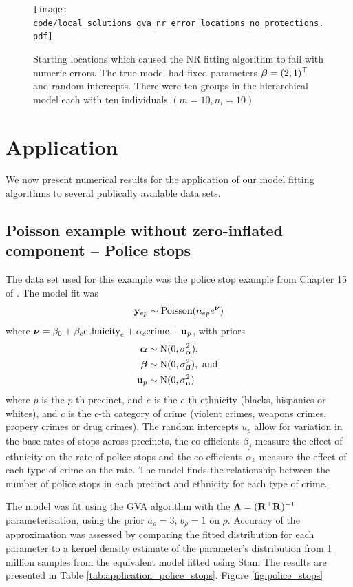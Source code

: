\begin{figure}[h!]
	\texttt{[image: code/local\_solutions\_gva\_nr\_error\_locations\_no\_protections.pdf]}
	\label{fig:stability_locations_nr}
	\caption{Starting locations which caused the NR fitting algorithm to fail with numeric errors. The true model had fixed parameters ${\boldsymbol \beta} = (2, 1)^\top$ and random intercepts. There were ten groups in the
	hierarchical model each	with ten individuals $(m=10, n_i=10)$}
\end{figure}

\section{Application}
We now present numerical results for the application of our model fitting algorithms to several publically
available data sets.

\label{sec:application}

\subsection{Poisson example without zero-inflated component -- Police stops}
\label{sec:police_stops}
The data set used for this example was the police stop example from Chapter 15 of \cite{Gelman2007}.
The model fit was
$$
	{\bf y}_{ep}        \sim \text{Poisson}(n_{ep} e^{\boldsymbol \nu})
$$
where ${\boldsymbol \nu} = {\beta_0 + \beta_e \text{ethnicity}_e + \alpha_{c} \text{crime} + {\bf u}_p}$, with priors
\begin{align*}
	{\boldsymbol\alpha}				& \sim \text{N}(0, \sigma_{\boldsymbol \alpha}^2),	\\
	{\boldsymbol \beta}        & \sim \text{N}(0, \sigma_{\boldsymbol \beta}^2), \text{ and }\\
	{\bf u}_p         & \sim \text{N}(0, \sigma_{\bf u}^2)
\end{align*}
where $p$ is the $p$-th precinct, and $e$ is the $e$-th ethnicity (blacks, hispanics or whites), and $c$ is
the $c$-th category of crime (violent crimes, weapons crimes, propery crimes or drug crimes). The random
intercepts $u_p$ allow for variation in the base rates of stops across precincts, the co-efficients $\beta_j$
measure the effect of ethnicity on the rate of police stops and the co-efficients $\alpha_k$ measure the
effect of each type of crime on the rate. The model finds the relationship between the number of police stops
in each precinct and  ethnicity for each type of crime.

The model was fit using the GVA algorithm with the ${\boldsymbol \Lambda} = ({\bf R}^\top {\bf R})^{-1}$ parameterisation, using
the prior $a_\rho = 3$, $b_\rho = 1$ on $\rho$. Accuracy of the approximation was assessed by comparing the
fitted distribution for each parameter to a kernel density estimate of the parameter's distribution from 1
million samples from the equivalent model fitted using Stan. The results are presented in Table
\ref{tab:application_police_stops}. Figure \ref{fig:police_stops}

